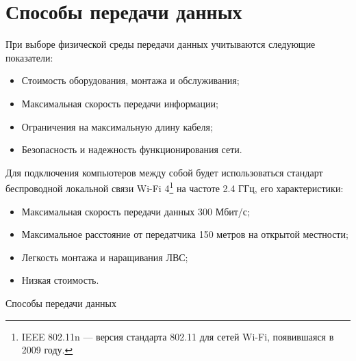 \documentclass[russian,utf8,pointsection,simple,14pt]{eskdtext}
\begin{document}
\tableofcontents
\newpage
\section{Способы передачи данных}
\point При выборе физической среды передачи данных учитываются следующие показатели:
\begin{itemize}
\item Стоимость оборудования, монтажа и обслуживания;
\item Максимальная скорость передачи информации;
\item Ограничения на максимальную длину кабеля;
\item Безопасность и надежность функционирования сети.
\end{itemize}

\point Для подключения компьютеров между собой будет использоваться стандарт беспроводной локальной связи Wi-Fi 4\footnote{ IEEE 802.11n — версия стандарта 802.11 для сетей Wi-Fi, появившаяся в 2009 году. } на частоте 2.4 ГГц, его характеристики:
\begin{itemize}
\item Максимальная скорость передачи данных 300 Мбит/с;
\item Максимальное расстояние от передатчика 150 метров на открытой местности;
\item Легкость монтажа и наращивания ЛВС;
\item Низкая стоимость. 
\end{itemize}

\point Способы передачи данных
\end{document}
